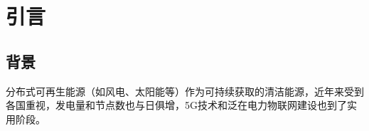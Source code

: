 \chapter{引言}
\label{cha:Intro}

\section{背景}

分布式可再生能源（如风电、太阳能等）作为可持续获取的清洁能源，近年来受到各国重视，发电量和节点数也与日俱增，5G技术和泛在电力物联网建设也到了实用阶段。


